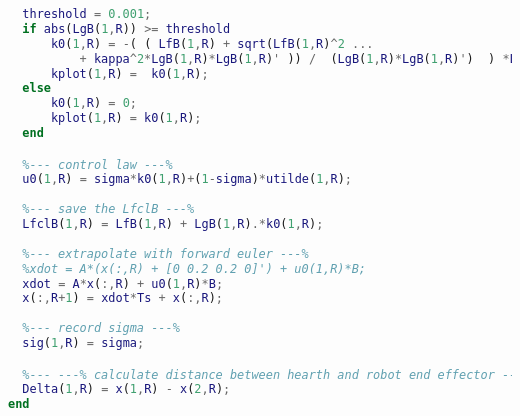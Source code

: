 \begin{lstlisting}[language=matlab]
  %--- Find safe controller ---%
  threshold = 0.001;
  if abs(LgB(1,R)) >= threshold
      k0(1,R) = -( ( LfB(1,R) + sqrt(LfB(1,R)^2 ...
          + kappa^2*LgB(1,R)*LgB(1,R)' )) /  (LgB(1,R)*LgB(1,R)')  ) *LgB(1,R);
      kplot(1,R) =  k0(1,R);
  else
      k0(1,R) = 0;
      kplot(1,R) = k0(1,R);
  end 

  %--- control law ---%
  u0(1,R) = sigma*k0(1,R)+(1-sigma)*utilde(1,R);
  
  %--- save the LfclB ---%  
  LfclB(1,R) = LfB(1,R) + LgB(1,R).*k0(1,R);
  
  %--- extrapolate with forward euler ---%
  %xdot = A*(x(:,R) + [0 0.2 0.2 0]') + u0(1,R)*B;
  xdot = A*x(:,R) + u0(1,R)*B;
  x(:,R+1) = xdot*Ts + x(:,R);
  
  %--- record sigma ---%
  sig(1,R) = sigma;

  %--- ---% calculate distance between hearth and robot end effector ---%
  Delta(1,R) = x(1,R) - x(2,R);
end
\end{lstlisting}